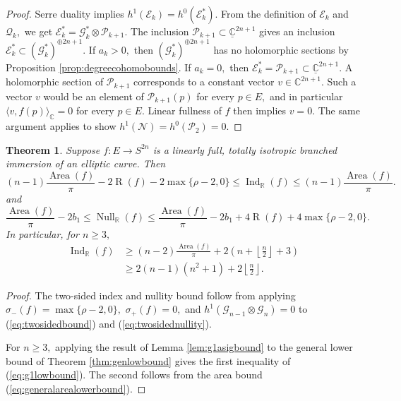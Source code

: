 \documentclass[11pt]{article}
\newtheorem{theorem}{Theorem}[section]
\theoremstyle{definition}
\newcommand{\R}{\mathbb{R}}
\newcommand{\C}{\mathbb{C}}
\numberwithin{equation}{section}
\begin{document}
\begin{proof}
    Serre duality implies $h^1(\mathcal{E}_k) = h^0(\mathcal{E}_k^*).$ From the definition of $\mathcal{E}_k$ and $\mathcal{Q}_k,$ we get $\mathcal{E}_k^* = \mathcal{G}_k^* \otimes \mathcal{P}_{k+1}.$ The inclusion $\mathcal{P}_{k+1} \subset \underline{\C}^{2n+1}$ gives an inclusion $\mathcal{E}_k^* \subset (\mathcal{G}^*_{k})^{\oplus 2n+1}.$ If $a_k > 0,$ then $(\mathcal{G}^*_{k})^{\oplus 2n+1}$ has no holomorphic sections by Proposition \ref{prop:degreecohomobounds}. If $a_k = 0,$ then $\mathcal{E}_k^* = \mathcal{P}_{k+1} \subset \underline{\C}^{2n+1}.$ A holomorphic section of $\mathcal{P}_{k+1}$ corresponds to a constant vector $v \in \C^{2n+1}.$ Such a vector $v$ would be an element of $\mathcal{P}_{k+1}(p)$ for every $p \in E,$ and in particular $\langle v, f(p) \rangle_\C = 0$ for every $p \in E.$ Linear fullness of $f$ then implies $v = 0.$ The same argument applies to show $h^1(\mathcal{N}) = h^0(\mathcal{P}_2) = 0.$
\end{proof}

\begin{theorem}
    Suppose $f: E \to S^{2n}$ is a linearly full, totally isotropic branched immersion of an elliptic curve. Then
    \begin{equation*}
        (n-1)\frac{\operatorname{Area}(f)}{\pi} - 2\operatorname{R}(f) - 2\max \lbrace \rho-2, 0 \rbrace \leq \operatorname{Ind}_\R(f) \leq (n-1)\frac{\operatorname{Area}(f)}{\pi}.
    \end{equation*}
    and
    \begin{equation*}
        \frac{\operatorname{Area}(f)}{\pi} - 2b_1 \leq \operatorname{Null}_\R(f) \leq \frac{\operatorname{Area}(f)}{\pi} - 2b_1 + 4\operatorname{R}(f) + 4 \max \lbrace \rho-2, 0 \rbrace.
    \end{equation*}
    In particular, for $n \geq 3,$
    \begin{equation}\label{eq:g1lowbound}
        \begin{aligned}
            \operatorname{Ind}_\R(f) &\geq (n-2)\frac{\operatorname{Area}(f)}{\pi} + 2 \left( n + \left\lfloor \frac{n}{2} \right\rfloor + 3 \right) \\
            & \geq 2(n-1)(n^2+1) + 2 \left\lfloor \frac{n}{2} \right\rfloor.
        \end{aligned}
    \end{equation}
\end{theorem}

\begin{proof}
    The two-sided index and nullity bound follow from applying $\sigma_-(f) = \max \lbrace \rho-2, 0 \rbrace,$ $\sigma_+(f) = 0,$ and $h^1(\mathcal{G}_{n-1} \otimes \mathcal{G}_n) = 0$ to (\ref{eq:twosidedbound}) and (\ref{eq:twosidednullity}).

    For $n \geq 3,$ applying the result of Lemma \ref{lem:g1asigbound} to the general lower bound of Theorem \ref{thm:genlowbound} gives the first inequality of (\ref{eq:g1lowbound}). The second follows from the area bound (\ref{eq:generalarealowerbound}).
\end{proof}
\end{document}
